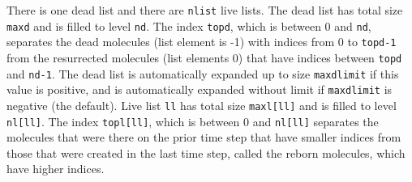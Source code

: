 \documentclass {scrbook}
\newcommand {\ttt} {\texttt}
\begin{document}
There is one dead list and there are \ttt{nlist} live lists. The dead list has total size \ttt{maxd} and is filled to level \ttt{nd}. The index \ttt{topd}, which is between 0 and \ttt{nd}, separates the dead molecules (list element is -1) with indices from 0 to \ttt{topd-1} from the resurrected molecules (list elements 0) that have indices between \ttt{topd} and \ttt{nd-1}. The dead list is automatically expanded up to size \ttt{maxdlimit} if this value is positive, and is automatically expanded without limit if \ttt{maxdlimit} is negative (the default). Live list \ttt{ll} has total size \ttt{maxl[ll]} and is filled to level \ttt{nl[ll]}. The index \ttt{topl[ll]}, which is between 0 and \ttt{nl[ll]} separates the molecules that were there on the prior time step that have smaller indices from those that were created in the last time step, called the reborn molecules, which have higher indices.
\end{document}
